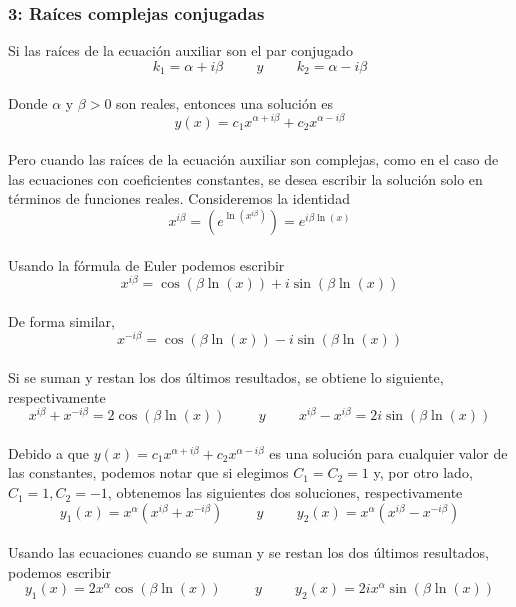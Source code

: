 \documentclass[12pt,letterpaper]{article}
\begin{document}
\subsubsection{\large 3: Raíces complejas conjugadas}
Si las raíces de la ecuación auxiliar son el par conjugado\\
$$k_{1}=\alpha+i\beta\hspace{1cm}y\hspace{1cm}k_{2}=\alpha-i\beta$$\\
Donde $\alpha$ y $\beta > 0$ son reales, entonces una solución es\\
$$y(x)=c_{1}x^{\alpha+i\beta}+c_{2}x^{\alpha-i\beta}$$\\
Pero cuando las raíces de la ecuación auxiliar son complejas, como en el caso de las ecuaciones con coeficientes constantes, se desea escribir la solución solo en términos de funciones reales. Consideremos la identidad\\
$$x^{i\beta}=(e^{\ln(x^{i\beta})})=e^{i\beta\ln(x)}$$\\
Usando la fórmula de Euler podemos escribir\\
$$x^{i\beta}=\cos\left(\beta\ln(x)\right)+i\sin\left(\beta\ln(x)\right)$$\\
De forma similar,
$$x^{-i\beta}=\cos\left(\beta\ln(x)\right)-i\sin\left(\beta\ln(x)\right)$$\\
Si se suman y restan los dos últimos resultados, se obtiene lo siguiente, respectivamente\\
$$x^{i\beta}+x^{-i\beta}=2\cos\left(\beta\ln(x)\right)\hspace{1cm} y \hspace{1cm}x^{i\beta}-x^{i\beta}=2i\sin\left(\beta\ln(x)\right)$$\\
Debido a que $y(x)=c_{1}x^{\alpha+i\beta}+c_{2}x^{\alpha-i\beta}$ es una solución para cualquier valor de las constantes, podemos notar que si elegimos $C_{1}=C_{2}=1$ y, por otro lado, $C_{1}=1,C_{2}=-1$, obtenemos las siguientes dos soluciones, respectivamente\\
$$y_{1}(x)=x^{\alpha}(x^{i\beta}+x^{-i\beta})\hspace{1cm}y\hspace{1cm}y_{2}(x)=x^{\alpha}(x^{i\beta}-x^{-i\beta})$$\\
Usando las ecuaciones cuando se suman y se restan los dos últimos resultados, podemos escribir\\
$$y_{1}(x)=2x^{\alpha}\cos\left(\beta\ln(x)\right)\hspace{1cm}y\hspace{1cm}y_{2}(x)=2ix^{\alpha}\sin\left(\beta\ln(x)\right)$$\\
\end{document}
